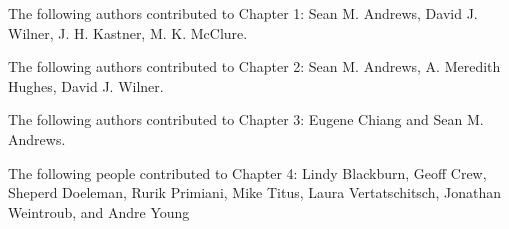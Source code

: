 
{\large
\linespread{1.}\selectfont{}
\noindent The following authors contributed to Chapter 1: \newline
Sean M. Andrews, David J. Wilner, J. H. Kastner, M. K. McClure.

\noindent The following authors contributed to Chapter 2: \newline
Sean M. Andrews, A. Meredith Hughes, David J. Wilner.

\noindent The following authors contributed to Chapter 3: \newline
Eugene Chiang and Sean M. Andrews.

\noindent The following people contributed to Chapter 4: \newline
Lindy Blackburn, Geoff Crew, Sheperd Doeleman, Rurik Primiani, Mike Titus, Laura Vertatschitsch, 
Jonathan Weintroub, and Andre Young
}
